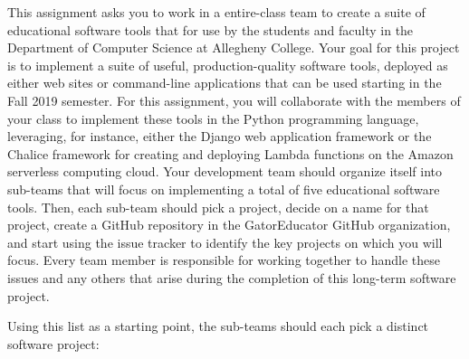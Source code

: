 \documentclass[11pt]{article}
\begin{document}

This assignment asks you to work in a entire-class team to create a suite of
educational software tools that for use by the students and faculty in the
Department of Computer Science at Allegheny College. Your goal for this project
is to implement a suite of useful, production-quality software tools, deployed
as either web sites or command-line applications that can be used starting in
the Fall 2019 semester.
%
For this assignment, you will collaborate with the members of your class to
implement these tools in the Python programming language, leveraging, for
instance, either the Django web application framework or the Chalice framework
for creating and deploying Lambda functions on the Amazon serverless computing
cloud.
%
Your development team should organize itself into sub-teams that will focus on
implementing a total of five educational software tools.
%
Then, each sub-team should pick a project, decide on a name for that project,
create a GitHub repository in the GatorEducator GitHub organization, and start
using the issue tracker to identify the key projects on which you will focus.
%
Every team member is responsible for working together to handle these issues and
any others that arise during the completion of this long-term software project.

Using this list as a starting point, the sub-teams should each pick a distinct
software project:

\vspace*{-.1in}
\end{document}
